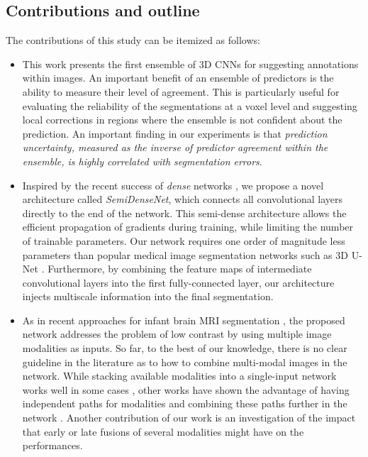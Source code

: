 \documentclass[twoside,espcrc2]{elsarticle}
\begin{document}
\subsection{Contributions and outline}
\label{ssec:contributions}

The contributions of this study can be itemized as follows:

\begin{itemize}

\item This work presents the first ensemble of 3D CNNs for suggesting annotations within images. 
An important benefit of an ensemble of predictors is the ability to measure their level of agreement. This is particularly useful for evaluating the reliability of the segmentations at a voxel level and suggesting local corrections in regions where the ensemble is not confident about the prediction. An important finding in our experiments is that {\em prediction uncertainty, measured as the inverse of predictor agreement within the ensemble, is highly correlated with segmentation errors}.

\item Inspired by the recent success of {\em dense} networks \cite{huang2016densely}, we propose a novel architecture called \emph{SemiDenseNet}, which connects all convolutional layers directly to the end of the network. This semi-dense architecture allows the efficient propagation of gradients during training, while limiting the number of trainable parameters. Our network requires one order of magnitude less parameters than popular medical image segmentation networks such as 3D U-Net \cite{cciccek20163d}. Furthermore, by combining the feature maps of intermediate convolutional layers into the first fully-connected layer, our architecture injects multiscale information into the final segmentation. 

\item As in recent approaches for infant brain MRI segmentation \cite{zhang2015deep,nie2016fully}, the proposed network addresses the problem of low contrast by using multiple image modalities as inputs. So far, to the best of our knowledge, there is no clear guideline in the literature as to how to combine multi-modal images in the network. While stacking available modalities into a single-input network works well in some cases \cite{zhang2015deep}, other works have shown the advantage of having independent paths for modalities and combining these paths further in the network \cite{nie2016fully}. Another contribution of our work is an  investigation of the impact that early or late fusions of several modalities might have on the performances. 


\end{itemize}
\end{document}
